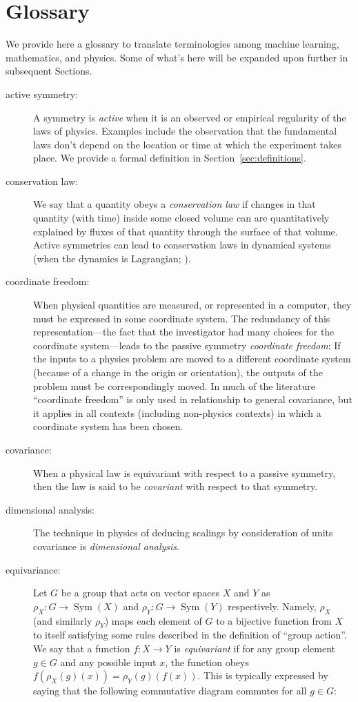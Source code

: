 \documentclass[preprint]{article} %
\newcommand{\sectionname}{Section}
\newcommand{\secref}[1]{\sectionname~\ref{#1}}
\begin{document}
\section{Glossary}\label{sec:glossary}
We provide here a glossary to translate terminologies among machine learning, mathematics, and physics.
Some of what's here will be expanded upon further in subsequent Sections.
\begin{description}
\item[active symmetry:]
A symmetry is \emph{active} when it is an observed or empirical regularity of the laws of physics.
Examples include the observation that the fundamental laws don't depend on the location or time at which the experiment takes place.
We provide a formal definition in \secref{sec:definitions}.
\item[conservation law:]
We say that a quantity obeys a \emph{conservation law} if changes in that quantity (with time) inside some closed volume can are quantitatively explained by fluxes of that quantity through the surface of that volume.
Active symmetries can lead to conservation laws in dynamical systems (when the dynamics is Lagrangian; \citealt{noether}).
\item[coordinate freedom:]
When physical quantities are measured, or represented in a computer, they must be expressed in some coordinate system.
The redundancy of this representation---the fact that the investigator had many choices for the coordinate system---leads to the passive symmetry \emph{coordinate freedom}:
If the inputs to a physics problem are moved to a different coordinate system (because of a change in the origin or orientation), the outputs of the problem must be correspondingly moved.
In much of the literature ``coordinate freedom'' is only used in relationship to general covariance, but it applies in all contexts (including non-physics contexts) in which a coordinate system has been chosen.
\item[covariance:]
When a physical law is equivariant with respect to a passive symmetry, then the law is said to be \emph{covariant} with respect to that symmetry.
\item[dimensional analysis:]
The technique in physics of deducing scalings by consideration of units covariance is \emph{dimensional analysis}.
\item[equivariance:]
Let $G$ be a group that acts on vector spaces $X$ and $Y$ as $\rho_X:G\to \operatorname{Sym}(X)$ and $\rho_Y:G\to \operatorname{Sym}(Y)$ respectively. Namely, $\rho_X$ (and similarly $\rho_Y$) maps each element of $G$ to a bijective function from $X$ to itself satisfying some rules described in the definition of ``group action''. We say that a function $f:X\to Y$ is \emph{equivariant} if for any group element $g\in G$ and any possible input $x$, the function obeys $f( \rho_X(g)(x)) = \rho_Y(g)(f(x))$. This is typically expressed by saying that the following commutative diagram commutes for all $g\in G$:

\end{description}
\end{document}
